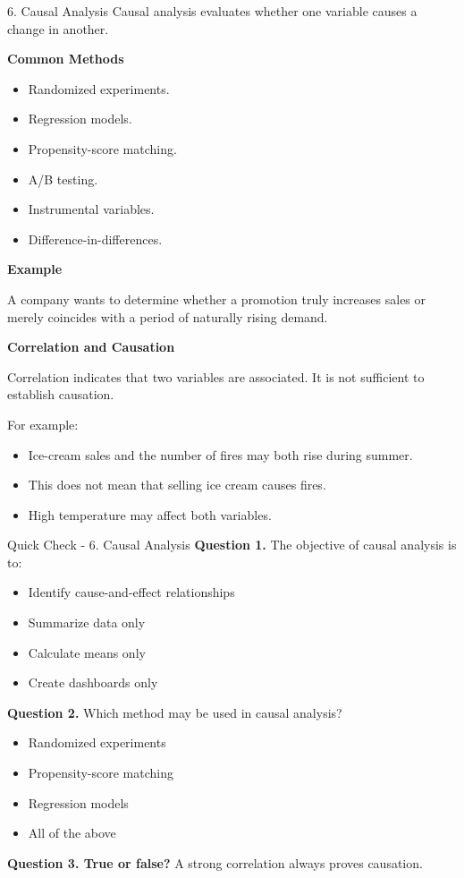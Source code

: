 \documentclass[aspectratio=169,11pt]{beamer}
\begin{document}
\begin{frame}[allowframebreaks]{6. Causal Analysis}
\footnotesize
Causal analysis evaluates whether one variable causes a change in another.\par\medskip
\textbf{Common Methods}\par\medskip
\begin{itemize}
\item Randomized experiments.
\item Regression models.
\item Propensity-score matching.
\item A/B testing.
\item Instrumental variables.
\item Difference-in-differences.
\end{itemize}
\textbf{Example}\par\medskip
A company wants to determine whether a promotion truly increases sales or merely coincides with a period of naturally rising demand.\par\medskip
\textbf{Correlation and Causation}\par\medskip
Correlation indicates that two variables are associated. It is not sufficient to establish causation.\par\medskip
For example:\par\medskip
\begin{itemize}
\item Ice-cream sales and the number of fires may both rise during summer.
\item This does not mean that selling ice cream causes fires.
\item High temperature may affect both variables.
\end{itemize}
\end{frame}
\begin{frame}[allowframebreaks]{Quick Check - 6. Causal Analysis}
\footnotesize
\textbf{Question 1.} The objective of causal analysis is to:\par\medskip
\begin{itemize}
\item[\textbf{A.}] Identify cause-and-effect relationships
\item[\textbf{B.}] Summarize data only
\item[\textbf{C.}] Calculate means only
\item[\textbf{D.}] Create dashboards only
\end{itemize}
\textbf{Question 2.} Which method may be used in causal analysis?\par\medskip
\begin{itemize}
\item[\textbf{A.}] Randomized experiments
\item[\textbf{B.}] Propensity-score matching
\item[\textbf{C.}] Regression models
\item[\textbf{D.}] All of the above
\end{itemize}
\textbf{Question 3. True or false?} A strong correlation always proves causation.\par\medskip
\end{frame}
\end{document}
